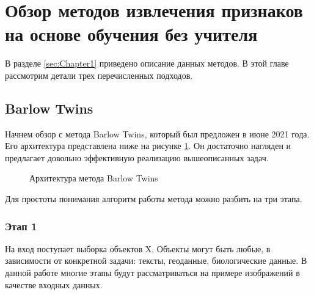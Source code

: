 \section{Обзор методов извлечения признаков на основе обучения без учителя}
\label{sec:Chapter2} 

В разделе \ref{sec:Chapter1} приведено описание данных методов. В этой главе рассмотрим детали трех перечисленных подходов.

\subsection{Barlow Twins}

Начнем обзор с метода Barlow Twins, который был предложен в июне 2021 года. Его архитектура представлена ниже на рисунке \ref{BT_arch}. Он достаточно нагляден и предлагает довольно эффективную реализацию вышеописанных задач. 

\begin{figure}[H]
        \caption{Архитектура метода Barlow Twins}
        \label{BT_arch}
\end{figure} 

Для простоты понимания алгоритм работы метода можно разбить на три этапа. 

\subsubsection{Этап 1}

На вход поступает выборка объектов X. Объекты могут быть любые, в зависимости от конкретной задачи: тексты, геоданные, биологические данные. В данной работе многие этапы будут рассматриваться на примере изображений в качестве входных данных.

